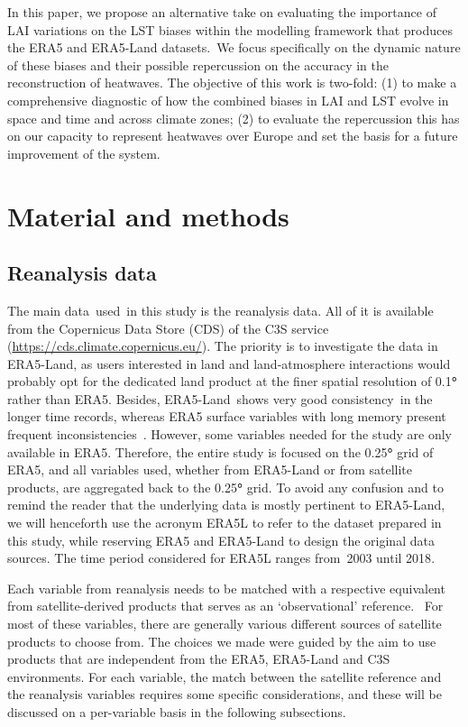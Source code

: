 \documentclass[gmd, manuscript]{copernicus}
\begin{document}
In this paper, we propose an alternative take on evaluating the
importance of LAI variations on the LST biases within the modelling
framework that produces the ERA5 and ERA5-Land datasets.~We focus
specifically on the dynamic nature of these biases and their possible
repercussion on the accuracy in the reconstruction of heatwaves. The
objective of this work is two-fold: (1) to make a comprehensive
diagnostic of how the combined biases in LAI and LST evolve in space and
time and across climate zones; (2) to evaluate the repercussion this has
on our capacity to represent heatwaves over Europe and set the basis for
a future improvement of the system.


\section{Material and methods}


\subsection{Reanalysis data}

The main data~used~in this study is the reanalysis data. All of it is
available from the Copernicus Data Store (CDS) of the C3S service
(\url{https://cds.climate.copernicus.eu/}). The priority is to
investigate the data in ERA5-Land, as users interested in land and
land-atmosphere interactions would probably opt for the dedicated land
product at the finer spatial resolution of 0.1\textbf{°} rather than
ERA5. Besides, ERA5-Land~shows very good consistency~in the longer time
records, whereas ERA5 surface variables with long memory present
frequent inconsistencies~\citep{Munoz_Sabater_2021}. However, some variables
needed for the study are only available in ERA5. Therefore, the entire
study is focused on the 0.25\textbf{°} grid of ERA5, and all variables
used, whether from ERA5-Land or from satellite products, are aggregated
back to the 0.25\textbf{°} grid. To avoid any confusion and to remind
the reader that the underlying data is mostly pertinent to ERA5-Land, we
will henceforth use the acronym ERA5L to refer to the dataset prepared
in this study, while reserving ERA5 and ERA5-Land to design the original
data sources. The time period considered for ERA5L ranges from~{2003
until 2018}.

Each variable from reanalysis needs to be matched with a respective
equivalent from satellite-derived products that serves as an
`observational' reference.~ For most of these variables, there are
generally various different sources of satellite products to choose
from. The choices we made were guided by the aim to use products that
are independent from the ERA5, ERA5-Land and C3S environments. For each
variable, the match between the satellite reference and the reanalysis
variables requires some specific considerations, and these will be
discussed on a per-variable basis in the following subsections.
\end{document}
